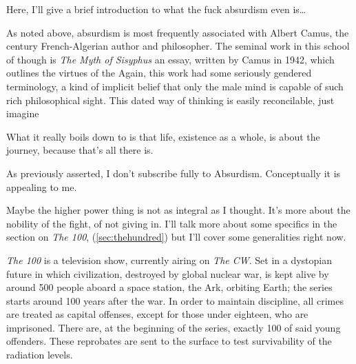 \documentclass[../butidigress.tex]{subfiles}
\begin{document}
\entryskip

Here, I'll give a brief introduction to what the fuck absurdism even is\ldots{}

As noted above, absurdism is most frequently associated with Albert Camus, the  century French-Algerian author and philosopher.
The seminal work in this school of though is \textit{The Myth of Sisyphus} an essay, written by Camus in 1942, which outlines the virtues of the 
Again, this work had some seriously gendered terminology, a kind of implicit belief that only the male mind is capable of such rich philosophical sight.
This dated way of thinking is easily reconcilable, just imagine 

What it really boils down to is that life, existence as a whole, is about the journey, because that's all there is.\autocite{mythofsisyphus}

As previously asserted, I don't subscribe fully to Absurdism.
Conceptually it is appealing to me.

Maybe the higher power thing is not as integral as I thought.
It's more about the nobility of the fight, of not giving in.
I'll talk more about some specifics in the section on \textit{The 100}, (\ref{sec:thehundred}) but I'll cover some generalities right now.


\textit{The 100} is a television show, currently airing on \textit{The CW}.
Set in a dystopian future in which civilization, destroyed by global nuclear war, is kept alive by around 500 people aboard a space station, the Ark, orbiting Earth; the series starts around 100 years after the war.
In order to maintain discipline, all crimes are treated as capital offenses, except for those under eighteen, who are imprisoned.
There are, at the beginning of the series, exactly 100 of said young offenders.
These reprobates are sent to the surface to test survivability of the radiation levels.
\end{document}
